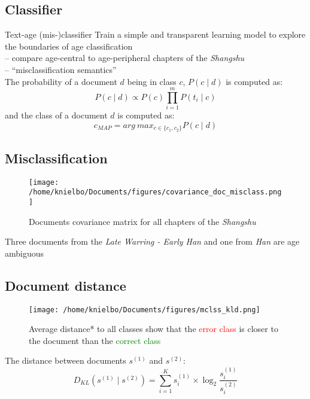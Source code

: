 \subsection{Classifier}
\begin{frame}{Text-age (mis-)classifier}
Train a simple and transparent learning model to explore the boundaries of age classification\\
	-- compare age-central to age-peripheral chapters of the \emph{Shangshu}\\
	-- ``misclassification semantics''\\ 
\medskip
The probability of a document $d$ being in class $c$, $P(c \mid d)$ is computed as:
\begin{equation*}
P(c \mid d) \propto P(c) \prod_{i = 1}^{m}P(t_i \mid c) 
\end{equation*}
and the class of a document $d$ is computed as:\\
\begin{equation*}%
c_{MAP} = arg~max_{c \in \{c_1, c_2 \}} P(c \mid d)
\end{equation*}
\end{frame}

\subsection{Misclassification}
\begin{frame}
	\begin{figure}
		\centering
		\texttt{[image: /home/knielbo/Documents/figures/covariance\_doc\_misclass.png]}
		\caption{Documents covariance matrix for all chapters of the \emph{Shangshu}}
	\end{figure}
Three documents from the \emph{Late Warring - Early Han} and one from \emph{Han} are age ambiguous\\ 
\end{frame}

\subsection{Document distance}
\begin{frame}
\begin{figure}
	\centering
	\texttt{[image: /home/knielbo/Documents/figures/mclss\_kld.png]}
	\caption{Average distance* to all classes show that the \textcolor{red}{error class} is closer to the document than the \textcolor{green}{correct class}}
\end{figure}

The distance between documents $s^{(1)}$ and $s^{(2)}$:
\begin{equation*}
D_{KL}(s^{(1)} \mid s^{(2)}) = \sum_{i = 1}^{K} s_i^{(1)} \times \log_2 \frac{s_i^{(1)}}{s_i^{(2)}}
\end{equation*}
\end{frame}

